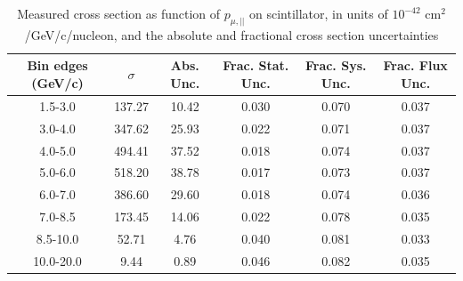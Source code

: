 \documentclass[../main.tex]{subfiles}
\begin{document}
\pagebreak
\begin{turnpage}
\end{turnpage}
\begin{table}
  \centering
  \renewcommand{\arraystretch}{1.15}
  \caption{Measured cross section as function of $p_{\mu,||}$ on scintillator, in units of $10^{-42}$ $\text{cm}^2$/GeV/c/nucleon, and the absolute and fractional cross section uncertainties}
    \begin{tabular}{c||c|c||c|c|c}
      Bin edges (GeV/c) &  $\sigma$  &  Abs. Unc.  &  Frac. Stat. Unc.  &  Frac. Sys. Unc.  &  Frac. Flux Unc. \\
      \hline
      \hline
      1.5-3.0 & 137.27 & 10.42 & 0.030 & 0.070 & 0.037\\
      3.0-4.0 & 347.62 & 25.93 & 0.022 & 0.071 & 0.037\\
      4.0-5.0 & 494.41 & 37.52 & 0.018 & 0.074 & 0.037\\
      5.0-6.0 & 518.20 & 38.78 & 0.017 & 0.073 & 0.037\\
      6.0-7.0 & 386.60 & 29.60 & 0.018 & 0.074 & 0.036\\
      7.0-8.5 & 173.45 & 14.06 & 0.022 & 0.078 & 0.035\\
      8.5-10.0 & 52.71 & 4.76 & 0.040 & 0.081 & 0.033\\
      10.0-20.0 & 9.44 & 0.89 & 0.046 & 0.082 & 0.035
    \end{tabular}
  \label{tbl:datanucleonplasticmuon_pza}
\end{table}
\begin{table}
  \centering
  \renewcommand{\arraystretch}{1.15}
  \caption{Statistical covariance matrix of measured cross section as function of $p_{\mu,||}$ on scintillator, in units of $10^{-84}$ $(\text{cm}^2$/GeV/c/nucleon$)^2$}
  \label{tbl:statnucleonplasticmuon_pzb}
\end{table}
\end{document}
